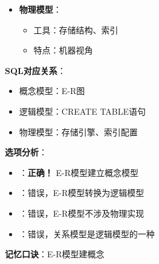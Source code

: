 \documentclass[12pt, a4paper]{article}
\newenvironment{bluebox}[1]{%
  \begin{trivlist}
  \item[\hskip\labelsep \textbf{#1}]
  \setlength{\parskip}{0.5ex}
  \setlength{\itemsep}{0.5ex}
}{%
  \end{trivlist}
  }
\begin{document}
\begin{bluebox}{例题6：E-R模型用途}
\begin{itemize}[leftmargin=*, nosep]
		\item \textbf{物理模型}：
		      \begin{itemize}[nosep]
			      \item 工具：存储结构、索引
			      \item 特点：机器视角
		      \end{itemize}
	\end{itemize}

	\textbf{SQL对应关系}：
	\begin{itemize}
		\item 概念模型：E-R图
		\item 逻辑模型：CREATE TABLE语句
		\item 物理模型：存储引擎、索引配置
	\end{itemize}

	\textbf{选项分析}：
	\begin{itemize}[nosep]
		\item[A) 概念模型]：\textbf{正确！} E-R模型建立概念模型
		\item[B) 逻辑模型]：错误，E-R模型转换为逻辑模型
		\item[C) 物理模型]：错误，E-R模型不涉及物理实现
		\item[D) 关系模型]：错误，关系模型是逻辑模型的一种
	\end{itemize}

	\textbf{记忆口诀}：E-R模型建概念
\end{bluebox}
\end{document}
